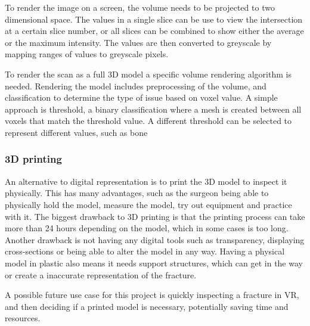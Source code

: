 \documentclass[a4paper]{report}
\begin{document}
To render the image on a screen, the volume needs to be projected to two dimensional space. The values in a single slice can be use to view the intersection at a certain slice number, or all slices can be combined to show either the average or the maximum intensity\cite{fishman_volume_2006}.
The values are then converted to greyscale by mapping ranges of values to greyscale pixels.

To render the scan as a full 3D model a specific volume rendering algorithm is needed. Rendering the model includes preprocessing of the volume, and classification to determine the type of issue based on voxel value. A simple approach is threshold, a binary classification where a mesh is created between all voxels that match the threshold value. A different threshold can be selected to represent different values, such as bone\cite{fishman_volume_2006}

\subsubsection{ 3D printing }

An alternative to digital representation is to print the 3D model to inspect it physically\cite{mishra_virtual_2019}. This has many advantages, such as the surgeon being able to physically hold the model, measure the model, try out equipment and practice with it.
The biggest drawback to 3D printing is that the printing process can take more than 24 hours depending on the model, which in some cases is too long. Another drawback is not having any digital tools such as transparency, displaying cross-sections or being able to alter the model in any way. Having a physical model in plastic also means it needs support structures, which can get in the way or create a inaccurate representation of the fracture.

A possible future use case for this project is quickly inspecting a fracture in VR, and then deciding if a printed model is necessary, potentially saving time and resources.

\end{document}

